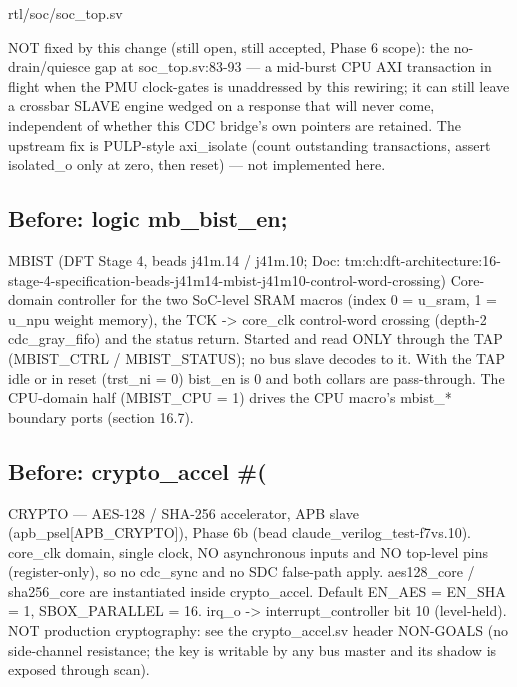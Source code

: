 \begin{relocated}{rtl/soc/soc_top.sv}
\begin{textblock}
NOT fixed by this change (still open, still accepted, Phase 6 scope):
the no-drain/quiesce gap at soc_top.sv:83-93 — a mid-burst CPU AXI
transaction in flight when the PMU clock-gates is unaddressed by this
rewiring; it can still leave a crossbar SLAVE engine wedged on a
response that will never come, independent of whether this CDC
bridge's own pointers are retained. The upstream fix is PULP-style
axi_isolate (count outstanding transactions, assert isolated_o only at
zero, then reset) — not implemented here.
\end{textblock}

\subsection*{Before: logic         mb\_bist\_en;}

\begin{textblock}
MBIST (DFT Stage 4, beads j41m.14 / j41m.10; Doc: tm:ch:dft-architecture:16-stage-4-specification-beads-j41m14-mbist-j41m10-control-word-crossing)
  Core-domain controller for the two SoC-level SRAM macros (index 0 = u_sram, 1 = u_npu weight memory),
  the TCK -> core_clk control-word crossing (depth-2 cdc_gray_fifo) and the status return. Started and
  read ONLY through the TAP (MBIST_CTRL / MBIST_STATUS); no bus slave decodes to it. With the TAP idle or
  in reset (trst_ni = 0) bist_en is 0 and both collars are pass-through.
  The CPU-domain half (MBIST_CPU = 1) drives the CPU macro's mbist_* boundary ports (section 16.7).
\end{textblock}

\subsection*{Before: crypto\_accel \#(}

\begin{textblock}
CRYPTO — AES-128 / SHA-256 accelerator, APB slave (apb_psel[APB_CRYPTO]),
Phase 6b (bead claude_verilog_test-f7vs.10). core_clk domain, single clock, NO asynchronous
inputs and NO top-level pins (register-only), so no cdc_sync and no SDC false-path apply.
aes128_core / sha256_core are instantiated inside crypto_accel. Default EN_AES = EN_SHA = 1,
SBOX_PARALLEL = 16. irq_o -> interrupt_controller bit 10 (level-held).
NOT production cryptography: see the crypto_accel.sv header NON-GOALS (no side-channel
resistance; the key is writable by any bus master and its shadow is exposed through scan).
\end{textblock}


\end{relocated}
